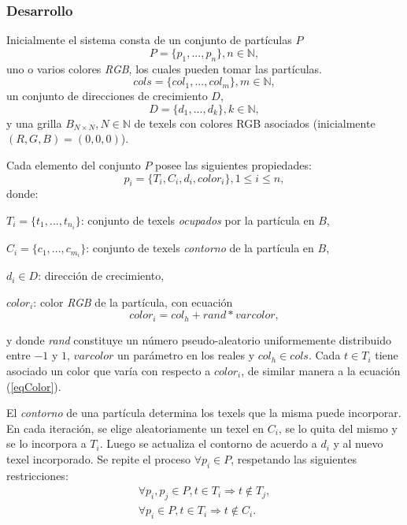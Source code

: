 \subsubsection{Desarrollo}
Inicialmente el sistema consta de un conjunto de part\'iculas $P$
\begin{equation}
P = \{p_{1}, ... , p_{n}\}, n  \in \mathbb{N},
\end{equation}
uno o varios colores {\em RGB}, los cuales pueden tomar las part\'iculas.
\begin{equation}
cols = \{col_{1}, ... , col_{m} \}, m \in \mathbb{N},
\end{equation}
un conjunto de direcciones de crecimiento $D$,
\begin{equation}
D = \{d_{1}, ... , d_{k} \}, k \in \mathbb{N},
\end{equation}
y una grilla $B_{N\times N}, N \in \mathbb{N} $ de texels con colores RGB asociados (inicialmente $(R,G,B)=(0,0,0)$).

Cada elemento del conjunto $P$ posee las siguientes propiedades:
\begin{equation}
p_{i} = \{T_{i}, C_{i}, d_{i}, color_{i}\}, 1 \le i \le n,
\end{equation}
donde:

$T_{i} = \{t_{1}, ... , t_{n_{i}}\}$: conjunto de texels {\em ocupados} por la part\'icula en $B$,

$C_{i} = \{c_{1}, ... , c_{m_{i}}\}$: conjunto de texels {\em contorno} de la part\'icula en $B$,

$d_{i} \in D$: direcci\'on de crecimiento,

$color_{i}$: color {\em RGB} de la part\'icula, con ecuaci\'on \cite{Reeves1983}
\begin{equation}
color_{i} = col_{h} + rand * varcolor,
\label{eqColor}
\end{equation}

\noindent
y donde {\it rand} constituye un n\'umero pseudo-aleatorio uniformemente distribuido entre $-1$ y $1$, $varcolor$ un parámetro en los reales y $col_{h} \in cols$.
Cada $t \in T_{i}$ tiene asociado un color que var\'ia con respecto a $color_{i}$, de similar manera a la ecuaci\'on (\ref{eqColor}).

El {\em contorno} de una part\'icula determina los texels que la misma puede incorporar. 
En cada iteraci\'on, se elige aleatoriamente un texel en $C_{i}$, se lo quita del mismo y se lo incorpora a $T_{i}$.
Luego se actualiza el contorno de acuerdo a $d_{i}$ y al nuevo texel incorporado.
Se repite el proceso $\forall p_{i} \in P$, respetando las siguientes restricciones:
\begin{eqnarray}
\forall p_{i}, p_{j} \in P, t \in T_{i} \Rightarrow t \notin T_{j}, \\
\forall p_{i} \in P, t \in T_{i} \Rightarrow t \notin C_{i}.
\end{eqnarray}

